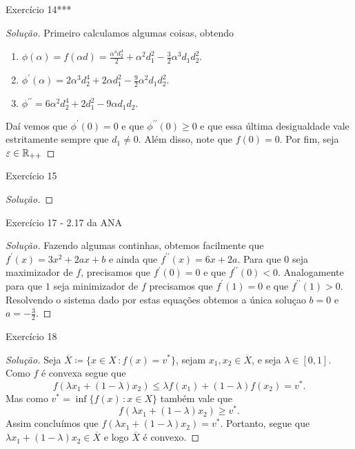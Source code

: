 \documentclass[12pt,twoside,a4paper]{article}
\begin{document}
\begin{problema}
  Exercício 14***
\end{problema}
\begin{proof}[Solução]
  Primeiro calculamos algumas coisas, obtendo
  \begin{enumerate}
  \item \(\phi(\alpha)=f(\alpha
    d)=\frac{\alpha^4d_2^4}{2}+\alpha^2d_1^2-\frac{3}{2}\alpha^3d_1d_2^2.\)
  \item \(\phi^\prime(\alpha)=2\alpha^3d_2^4+ 2\alpha d_1^2 -
    \frac{9}{2}\alpha^2d_1d_2^2.\)
  \item \(\phi^{\prime\prime}=6\alpha^2d_2^4+2d_1^2-9\alpha d_1d_2.\)
  \end{enumerate}
 Daí vemos que \(\phi^\prime(0)=0\) e que \(\phi^{\prime\prime}(0)\geq 0\) e que
 essa última desigualdade vale estritamente sempre que \(d_1\not =0\). Além
 disso, note que \(f(0)=0\). Por fim, seja \(\varepsilon\in\mathbb{R}_{++}\) 
\end{proof}

\begin{problema}
  Exercício 15
\end{problema}
\begin{proof}[Solução]
  
\end{proof}

\begin{problema}
 Exercício 17 - 2.17 da ANA  
 \end{problema}
 \begin{proof}[Solução]
   Fazendo algumas continhas, obtemos facilmente que
   \(f^\prime(x)= 3x^2+2ax+b\) e
  ainda que \(f^{\prime\prime}(x)=6x+2a\). Para que \(0\) seja maximizador
  de
  \(f\), precisamos que \(f^\prime(0) =0\) e que \(f^{\prime\prime}(0)<0\).
  Analogamente para que \(1\) seja minimizador de \(f\) precisamos que
  \(f^\prime(1)=0\) e que \(f^{\prime\prime}(1)>0\). Resolvendo o sistema
  dado por estas equações obtemos a única soluçao \(b=0\) e \(a=-\frac{3}{2}\). 
 \end{proof}

\begin{problema}
Exercício 18
\end{problema}
\begin{proof}[Solução]
  Seja \(\overline{X}\coloneqq\{x\in X\,\colon f(x)=v^\ast\}\), sejam
  \(x_1,x_2\in\overline{X}\), e seja \(\lambda\in [0,1]\). Como \(f\)
  é convexa segue que \[f(\lambda x_1+ (1-\lambda)x_2)\leq\lambda
    f(x_1)+(1-\lambda)f(x_2)=v^\ast.\]
  Mas como \(v^\ast=\inf\{f(x)\,\colon x\in X\}\) também vale que
  \[f(\lambda x_1+ (1-\lambda)x_2)\geq v^\ast.\]
  Assim concluímos que \(f(\lambda x_1+ (1-\lambda)x_2)= v^\ast.\) Portanto,
  segue que \(\lambda x_1 + (1-\lambda)x_2\in\overline{X}\) e logo
  \(\overline{X}\) é convexo.
\end{proof}
\end{document}
